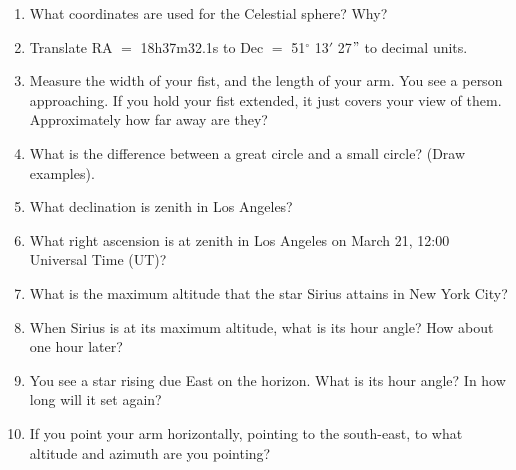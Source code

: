 
\begin{enumerate}
\item What coordinates are used for the Celestial sphere? Why?
\vspace{80pt}
\item Translate RA $=$ 18h37m32.1s to Dec $=$ 51$^\circ$ 13$'$ 27$"$
  to decimal units.
\vspace{80pt}
\item Measure the width of your fist, and the length of your arm. You
  see a person approaching. If you hold your fist extended, it just
  covers your view of them.  Approximately how far away are they?
\vspace{80pt}
\item What is the difference between a great circle and a small
  circle? (Draw examples).
\vspace{80pt}
\item What declination is zenith in Los Angeles?
\vspace{80pt}
\item What right ascension is at zenith in Los Angeles on March 21,
  12:00 Universal Time (UT)?
\vspace{80pt}
\item What is the maximum altitude that the star Sirius attains in New
  York City?
\vspace{80pt}
\item When Sirius is at its maximum altitude, what is its hour angle?
  How about one hour later?
\vspace{80pt}
\item You see a star rising due East on the horizon.  What is its hour
  angle? In how long will it set again?
\vspace{80pt}
\item If you point your arm horizontally, pointing to the south-east,
to what altitude and azimuth are you pointing?
\vspace{80pt}

\end{enumerate}
